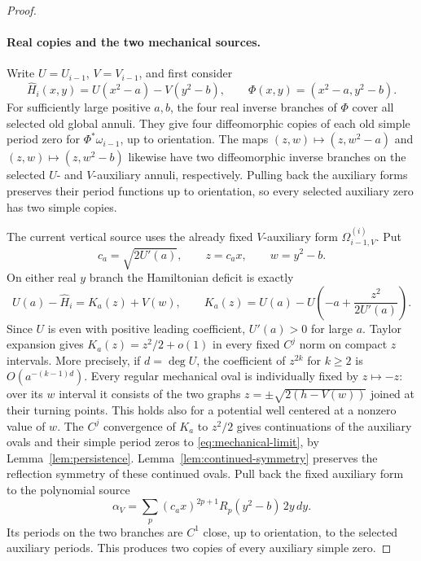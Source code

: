 \begin{proof}
\paragraph{Real copies and the two mechanical sources.}
Write $U=U_{i-1}$, $V=V_{i-1}$, and first consider
\[
 \widehat H_i(x,y)=U(x^2-a)-V(y^2-b),\qquad
 \Phi(x,y)=(x^2-a,y^2-b).
\]
For sufficiently large positive $a,b$, the four real inverse branches
of $\Phi$ cover all selected old global annuli.  They give four
diffeomorphic copies of each old simple period zero for
$\Phi^*\omega_{i-1}$, up to orientation.  The maps $(z,w)\mapsto(z,w^2-a)$ and
$(z,w)\mapsto(z,w^2-b)$ likewise have two diffeomorphic inverse branches
on the selected $U$- and $V$-auxiliary annuli, respectively. Pulling back
the auxiliary forms preserves their period functions up to orientation,
so every selected auxiliary zero has two simple copies.

The current vertical source uses the already fixed $V$-auxiliary form
$\Omega_{i-1,V}^{(i)}$.  Put
\[
 c_a=\sqrt{2U'(a)},\qquad z=c_a x,\qquad w=y^2-b.
\]
On either real $y$ branch the Hamiltonian deficit is exactly
\begin{equation}\label{eq:mechanical-limit}
 U(a)-\widehat H_i=K_a(z)+V(w),\qquad
 K_a(z)=U(a)-U\left(-a+\frac{z^2}{2U'(a)}\right).
\end{equation}
Since $U$ is even with positive leading coefficient, $U'(a)>0$ for
large $a$.  Taylor expansion gives $K_a(z)=z^2/2+o(1)$ in every fixed
$C^j$ norm on compact $z$ intervals.  More precisely, if $d=\deg U$,
the coefficient of $z^{2k}$ for $k\geq2$ is
$O(a^{-(k-1)d})$. Every regular mechanical oval is individually fixed
by $z\mapsto-z$: over its $w$ interval it consists of the two graphs
$z=\pm\sqrt{2(h-V(w))}$ joined at their turning points. This holds
also for a potential well centered at a nonzero value of $w$. The
$C^j$ convergence of $K_a$ to $z^2/2$ gives continuations of the auxiliary
ovals and their simple period zeros to \eqref{eq:mechanical-limit}, by
Lemma~\ref{lem:persistence}. Lemma~\ref{lem:continued-symmetry} preserves
the reflection symmetry of these continued ovals.  Pull back the fixed auxiliary form to
the polynomial source
\begin{equation}\label{eq:mechanical-vertical}
 \alpha_V=
 \sum_p(c_a x)^{2p+1}R_p(y^2-b)\,2y\,dy.
\end{equation}
Its periods on the two branches are $C^1$ close, up to orientation, to
the selected auxiliary periods.  This produces two copies of every
auxiliary simple zero.


\end{proof}
